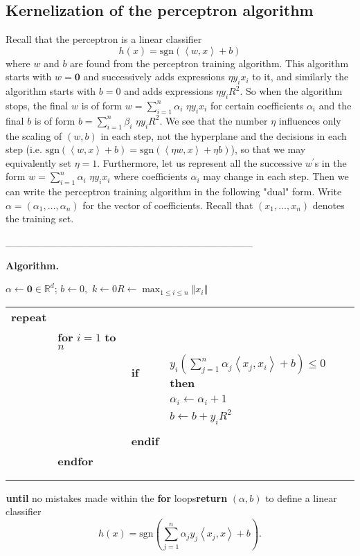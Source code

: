 \documentclass[11pt,twoside]{article}%
\theoremstyle{change}
\begin{document}
\subsection{Kernelization of the perceptron algorithm\ }

Recall that the perceptron is a linear classifier
\[
h(x)=\mathrm{sgn}\left(  \left\langle w,x\right\rangle +b\right)
\]
where $w$ and $b$ are found from the perceptron training algorithm. This
algorithm starts with $w=\mathbf{0}$ and successively adds expressions $\eta
y_{i}x_{i}$ to it, and similarly the algorithm starts with $b=0$ and adds
expressions $\eta y_{i}R^{2}$. So when the algorithm stops, the final $w$ is
of form $w=\sum_{i=1}^{n}\alpha_{i}$ $\eta y_{i}x_{i}$ for certain
coefficients $\alpha_{i}$ and the final $b$ is of form $b=\sum_{i=1}^{n}%
\beta_{i}$ $\eta y_{i}R^{2}$. We see that the number $\eta$ influences only
the scaling of $\left(  w,b\right)  $ in each step, not the hyperplane and the
decisions in each step (i.e. $\mathrm{sgn}\left(  \left\langle
w,x\right\rangle +b\right)  =\mathrm{sgn}\left(  \left\langle \eta
w,x\right\rangle +\eta b\right)  $), so that we may equivalently set $\eta=1$.
Furthermore, let us represent all the successive $w^{\prime}$s in the form
$w=\sum_{i=1}^{n}\alpha_{i}$ $\eta y_{i}x_{i}$ where coefficients $\alpha_{i}$
may change in each step. Then we can write the perceptron training algorithm
in the following "dual" form. Write $\alpha=\left(  \alpha_{1},\ldots
,\alpha_{n}\right)  $ for the vector of coefficients. Recall that $\left(
x_{1},\ldots,x_{n}\right)  $ denotes the training set. \newpage

\_\_\_\_\_\_\_\_\_\_\_\_\_\_\_\_\_\_\_\_\_\_\_\_\_\_\_\_\_\_\_\_\_\_

\textbf{Algorithm. }

$\alpha\leftarrow\mathbf{0}\in\mathbb{R}^{d}$; $b\leftarrow0,$ $k\leftarrow
0$\newline$R\leftarrow\max_{1\leq i\leq n}\left\Vert x_{i}\right\Vert
$\newline%

\begin{tabular}
[c]{llll}%
\textbf{repeat} &  &  & \\
& \textbf{for} $i=1$ \textbf{to} $n$ &  & \\
&  & \textbf{if} & $y_{i}\left(  \sum_{j=1}^{n}\alpha_{j}\left\langle
x_{j},x_{i}\right\rangle +b\right)  \leq0$ \textbf{then}\\
&  &  & $\alpha_{i}\leftarrow\alpha_{i}+1$\\
&  &  & $b\leftarrow b+y_{i}R^{2}$\\
&  &  & \\
&  & \textbf{endif} & \\
& \textbf{endfor} &  & \\
&  &  & \\
&  &  &
\end{tabular}
$_{{}}$\newline\textbf{until} no mistakes made within the \textbf{for}
loops\newline\textbf{return} $\left(  \alpha,b\right)  $ to define a linear
classifier
\[
h(x)=\mathrm{sgn}\left(  \sum_{j=1}^{n}\alpha_{j}y_{j}\left\langle
x_{j},x\right\rangle +b\right)  .
\]
\end{document}
